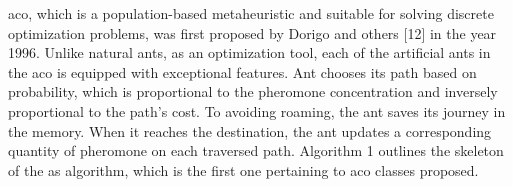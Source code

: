 \acrfull{aco}, which is a population-based metaheuristic and suitable for solving discrete optimization problems, was first proposed by Dorigo and others [12] in the year 1996. Unlike natural ants, as an optimization tool, each of the artificial ants in the \gls{aco} is equipped with exceptional features. Ant chooses its path based on probability, which is proportional to the pheromone concentration and inversely proportional to the path's cost. To avoiding roaming, the ant saves its journey in the memory. When it reaches the destination, the ant updates a corresponding quantity of pheromone on each traversed path. Algorithm 1 outlines the skeleton of the \gls{as} algorithm, which is the first one pertaining to \gls{aco} classes proposed.
